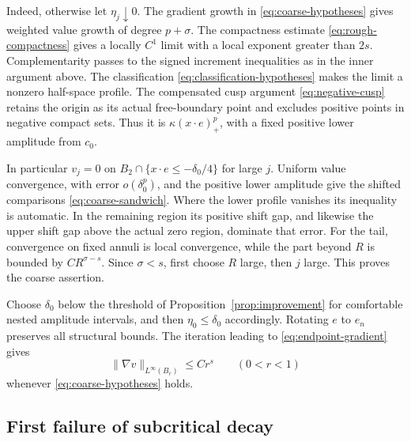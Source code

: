 \documentclass[11pt]{article}
\numberwithin{equation}{section}
\begin{document}
Indeed, otherwise let $\eta_j\downarrow0$. The gradient growth in
\eqref{eq:coarse-hypotheses} gives weighted value growth of degree
$p+\sigma$. The compactness estimate \eqref{eq:rough-compactness} gives a
locally $C^1$ limit with a local exponent greater than $2s$.
Complementarity passes to the signed increment inequalities as in the
inner argument above. The classification
\eqref{eq:classification-hypotheses} makes the limit a nonzero half-space
profile. The compensated cusp argument \eqref{eq:negative-cusp} retains
the origin as its actual free-boundary point and excludes positive points
in negative compact sets. Thus it is $\kappa(x\cdot e)_+^p$, with a fixed
positive lower amplitude from $c_0$.

In particular $v_j=0$ on $B_2\cap\{x\cdot e\leq-\delta_0/4\}$ for
large $j$. Uniform value convergence, with error $o(\delta_0^p)$, and
the positive lower amplitude give the shifted comparisons
\eqref{eq:coarse-sandwich}. Where the lower profile vanishes its inequality
is automatic. In the remaining region its positive shift gap, and likewise
the upper shift gap above the actual zero region, dominate that error.
For the tail, convergence on fixed annuli is local convergence, while the
part beyond $R$ is bounded by $CR^{\sigma-s}$. Since $\sigma<s$, first
choose $R$ large, then $j$ large. This proves the coarse assertion.

Choose $\delta_0$ below the threshold of Proposition~\ref{prop:improvement}
for comfortable nested amplitude intervals, and then $\eta_0\leq\delta_0$
accordingly. Rotating $e$ to $e_n$ preserves all structural bounds.
The iteration leading to \eqref{eq:endpoint-gradient} gives
\begin{equation}\label{eq:coarse-to-endpoint}
       \|\nabla v\|_{L^\infty(B_r)}\leq Cr^s\qquad(0<r<1)
\end{equation}
whenever \eqref{eq:coarse-hypotheses} holds.

\subsection{First failure of subcritical decay}
\end{document}
